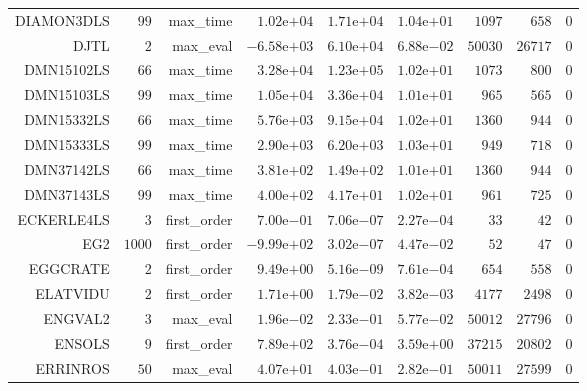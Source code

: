 \begin{longtable}{rrrrrrrrr}
DIAMON3DLS & \(    99\) & max\_time & \( 1.02\)e\(+04\) & \( 1.71\)e\(+04\) & \( 1.04\)e\(+01\) & \(  1097\) & \(   658\) & \(     0\) \\
DJTL & \(     2\) & max\_eval & \(-6.58\)e\(+03\) & \( 6.10\)e\(+04\) & \( 6.88\)e\(-02\) & \( 50030\) & \( 26717\) & \(     0\) \\
DMN15102LS & \(    66\) & max\_time & \( 3.28\)e\(+04\) & \( 1.23\)e\(+05\) & \( 1.02\)e\(+01\) & \(  1073\) & \(   800\) & \(     0\) \\
DMN15103LS & \(    99\) & max\_time & \( 1.05\)e\(+04\) & \( 3.36\)e\(+04\) & \( 1.01\)e\(+01\) & \(   965\) & \(   565\) & \(     0\) \\
DMN15332LS & \(    66\) & max\_time & \( 5.76\)e\(+03\) & \( 9.15\)e\(+04\) & \( 1.02\)e\(+01\) & \(  1360\) & \(   944\) & \(     0\) \\
DMN15333LS & \(    99\) & max\_time & \( 2.90\)e\(+03\) & \( 6.20\)e\(+03\) & \( 1.03\)e\(+01\) & \(   949\) & \(   718\) & \(     0\) \\
DMN37142LS & \(    66\) & max\_time & \( 3.81\)e\(+02\) & \( 1.49\)e\(+02\) & \( 1.01\)e\(+01\) & \(  1360\) & \(   944\) & \(     0\) \\
DMN37143LS & \(    99\) & max\_time & \( 4.00\)e\(+02\) & \( 4.17\)e\(+01\) & \( 1.02\)e\(+01\) & \(   961\) & \(   725\) & \(     0\) \\
ECKERLE4LS & \(     3\) & first\_order & \( 7.00\)e\(-01\) & \( 7.06\)e\(-07\) & \( 2.27\)e\(-04\) & \(    33\) & \(    42\) & \(     0\) \\
EG2 & \(  1000\) & first\_order & \(-9.99\)e\(+02\) & \( 3.02\)e\(-07\) & \( 4.47\)e\(-02\) & \(    52\) & \(    47\) & \(     0\) \\
EGGCRATE & \(     2\) & first\_order & \( 9.49\)e\(+00\) & \( 5.16\)e\(-09\) & \( 7.61\)e\(-04\) & \(   654\) & \(   558\) & \(     0\) \\
ELATVIDU & \(     2\) & first\_order & \( 1.71\)e\(+00\) & \( 1.79\)e\(-02\) & \( 3.82\)e\(-03\) & \(  4177\) & \(  2498\) & \(     0\) \\
ENGVAL2 & \(     3\) & max\_eval & \( 1.96\)e\(-02\) & \( 2.33\)e\(-01\) & \( 5.77\)e\(-02\) & \( 50012\) & \( 27796\) & \(     0\) \\
ENSOLS & \(     9\) & first\_order & \( 7.89\)e\(+02\) & \( 3.76\)e\(-04\) & \( 3.59\)e\(+00\) & \( 37215\) & \( 20802\) & \(     0\) \\
ERRINROS & \(    50\) & max\_eval & \( 4.07\)e\(+01\) & \( 4.03\)e\(-01\) & \( 2.82\)e\(-01\) & \( 50011\) & \( 27599\) & \(     0\) \\

\end{longtable}
